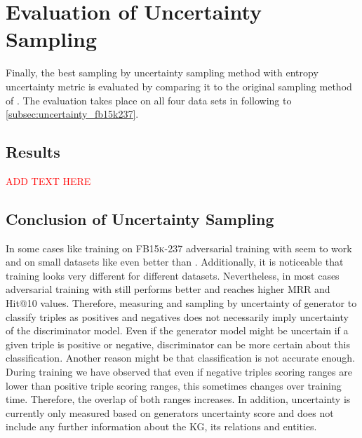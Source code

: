 \section{Evaluation of Uncertainty Sampling}
\label{ch:evaluation:sec:evaluation_uncertainty}

Finally, the best sampling by uncertainty sampling method \ussoftmax with entropy uncertainty metric is evaluated by comparing it to the original sampling method \origsampling of \kbgan.
The evaluation takes place on all four data sets in following  to \ref{subsec:uncertainty_fb15k237}.









\subsection{Results}

\textcolor{red}{ADD TEXT HERE}





\subsection{Conclusion of Uncertainty Sampling}
In some cases like training on \textsc{FB15k-237} adversarial training with \ussoftmax seem to work and on small datasets like \umls even better than \origsampling.
Additionally, it is noticeable that training looks very different for different datasets.
Nevertheless, in most cases adversarial training with \origsampling still performs better and reaches higher MRR and Hit@10 values.
Therefore, measuring and sampling by uncertainty of generator to classify triples as positives and negatives does not necessarily imply uncertainty of the discriminator model.
Even if the generator model might be uncertain if a given triple is positive or negative, discriminator can be more certain about this classification.
Another reason might be that classification is not accurate enough.
During training we have observed that even if negative triples scoring ranges are lower than positive triple scoring ranges, this sometimes changes over training time.
Therefore, the overlap of both ranges increases.
In addition, uncertainty is currently only measured based on generators uncertainty score and does not include any further information about the \ac{KG}, its relations and entities.


